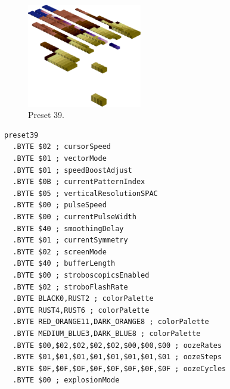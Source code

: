 \clearpage
\begin{minipage}[b]{0.48\linewidth}
\begin{figure}[H]                                                          
  \centering                                                             
  \begin{adjustbox}{width=5cm,center}                                   
  \includegraphics[width=5cm]{src/colorspace_presets/preset39-45.png}%
  \end{adjustbox}                                                        
\caption*{Preset 39.}                                           
\end{figure}                                                               
\end{minipage}
\hspace{0.1cm}
\begin{minipage}[b]{0.48\linewidth}                            
\begin{lstlisting}[basicstyle=\ttfamily\tiny]
preset39
  .BYTE $02 ; cursorSpeed
  .BYTE $01 ; vectorMode
  .BYTE $01 ; speedBoostAdjust
  .BYTE $0B ; currentPatternIndex
  .BYTE $05 ; verticalResolutionSPAC
  .BYTE $00 ; pulseSpeed
  .BYTE $00 ; currentPulseWidth
  .BYTE $40 ; smoothingDelay
  .BYTE $01 ; currentSymmetry
  .BYTE $02 ; screenMode
  .BYTE $40 ; bufferLength
  .BYTE $00 ; stroboscopicsEnabled
  .BYTE $02 ; stroboFlashRate
  .BYTE BLACK0,RUST2 ; colorPalette
  .BYTE RUST4,RUST6 ; colorPalette
  .BYTE RED_ORANGE11,DARK_ORANGE8 ; colorPalette
  .BYTE MEDIUM_BLUE3,DARK_BLUE8 ; colorPalette
  .BYTE $00,$02,$02,$02,$02,$00,$00,$00 ; oozeRates
  .BYTE $01,$01,$01,$01,$01,$01,$01,$01 ; oozeSteps
  .BYTE $0F,$0F,$0F,$0F,$0F,$0F,$0F,$0F ; oozeCycles
  .BYTE $00 ; explosionMode
\end{lstlisting}
\end{minipage}

\vspace*{0.3cm}

